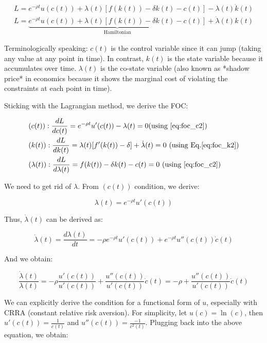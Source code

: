 \documentclass[11pt,a4paper]{book}
\theoremstyle{definition}\newtheorem{definition}{Definition}
\theoremstyle{definition}\newtheorem{fact}{Fact}
\theoremstyle{definition}\newtheorem{remark}{Remark}
\theoremstyle{definition}\newtheorem{ex}{Ex.}
\theoremstyle{definition}\newtheorem{project}{Project}
\theoremstyle{definition}\newtheorem{problem}{Problem}
\theoremstyle{definition}\newtheorem{example}{Example}
\numberwithin{theorem}{section}
\numberwithin{corollary}{chapter}
\numberwithin{assumption}{chapter}
\numberwithin{definition}{chapter}
\numberwithin{prop}{chapter}
\numberwithin{notation}{chapter}
\numberwithin{problem}{chapter}
\numberwithin{example}{chapter}
\numberwithin{fact}{chapter}
\numberwithin{ex}{chapter}
\begin{document}
\begin{align}
     L = {e^{-\rho t} u(c(t)) + \lambda(t) \left[ f( k(t)) - \delta k(t) - c(t)  \right]} -  \lambda(t)\dot{k}(t)     \label{eq:foc_c2} \\                            
     L =  \underbrace{e^{-\rho t} u(c(t)) + \lambda(t) \left[ f( k(t)) - \delta k(t) - c(t)  \right]}_{\text{Hamiltonian}}+  \dot{\lambda}(t)k(t)  \label{eq:foc_k2}
\end{align}

Terminologically speaking: $c(t)$ is the control variable since it can jump (taking any value at any point in time). In contrast, $k(t)$ is the state variable because it accumulates over time. ${\lambda}(t)$ is the co-state variable (also known as *shadow price* in economics because it shows the marginal cost of violating the constraints at each point in time). 

Sticking with the Lagrangian method, we derive the FOC:

\begin{align}
     &(c(t)): \frac{dL}{d c(t)} = e^{-\rho t} u'(c(t)) - \lambda(t) = 0  \text{(using \eqref{eq:foc_c2})}     \\   
     &(k(t)): \frac{dL}{d k(t)} = \lambda(t) [ f'(k(t)) - \delta] + \dot{\lambda}(t) = 0 \ \text{(using Eq.\eqref{eq:foc_k2})} \\
     &(\lambda(t)): \frac{dL}{d \lambda(t)} = f(k(t)) - \delta k(t) - c(t) = 0 \ \text{(using \eqref{eq:foc_c2})}           
\end{align}

We need to get rid of $\lambda$. From $(c(t))$ condition, we derive:

$$
    \lambda(t) = e^{-\rho t} u'(c(t))
$$

Thus, $\dot{\lambda}(t)$ can be derived as:

$$
    \dot{\lambda}(t) = \frac{d \lambda(t)}{dt} = -\rho e^{-\rho t} u'(c(t)) + e^{-\rho t} u''(c(t)) \dot{c}(t)
$$

And we obtain:

$$
    \frac{\dot{\lambda}(t)}{\lambda(t)} = -\rho \frac{u'(c(t))}{u'(c(t))} + \frac{u''(c(t))}{u'(c(t))}\dot{c}(t) = - \rho + \frac{u''(c(t))}{u'(c(t))}\dot{c}(t)
$$

We can explicitly derive the condition for a functional form of $u$, especially with CRRA (constant relative risk aversion). For simplicity, let $u(c) = \ln(c)$, then $u'(c(t)) = \frac{1}{c(t)}$ and $u''(c(t)) = \frac{-1}{c^2(t)}$. Plugging back into the above equation, we obtain:
\end{document}
